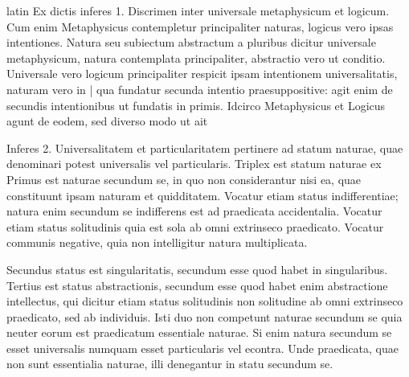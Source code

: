 \begin{otherlanguage*}{latin}
\pstart
 Ex dictis inferes 1. Discrimen inter universale metaphysicum et logicum. Cum enim Metaphysicus contempletur principaliter naturas, logicus vero ipsas intentiones. Natura seu subiectum abstractum a pluribus dicitur universale metaphysicum, natura contemplata principaliter, abstractio vero ut conditio. Universale vero logicum principaliter respicit ipsam intentionem universalitatis, naturam vero in \textnormal{|} qua fundatur secunda intentio praesuppositive: agit enim de secundis intentionibus ut fundatis in primis. Idcirco Metaphysicus et Logicus agunt de eodem, sed diverso modo ut ait  
\pend

\pstart
 Inferes 2. Universalitatem et particularitatem pertinere ad statum naturae, quae denominari potest universalis vel particularis. Triplex est statum naturae ex  Primus est naturae secundum se, in quo non considerantur nisi ea, quae constituunt ipsam naturam et quidditatem. Vocatur etiam status indifferentiae; natura enim secundum se indifferens est ad praedicata accidentalia. Vocatur etiam status solitudinis quia est sola ab omni extrinseco praedicato. Vocatur communis negative, quia non intelligitur natura multiplicata. 
\pend

\pstart
 Secundus status est singularitatis, secundum esse quod habet in singularibus. Tertius est status abstractionis, secundum esse quod habet enim abstractione intellectus, qui dicitur etiam status solitudinis non solitudine ab omni extrinseco praedicato, sed ab individuis. Isti duo non competunt naturae secundum se quia neuter eorum est praedicatum essentiale naturae. Si enim natura secundum se esset universalis numquam esset particularis vel econtra. Unde praedicata, quae non sunt essentialia naturae, illi denegantur in statu secundum se. 
\pend

        \pstart
        \pend
      

\end{otherlanguage*}

